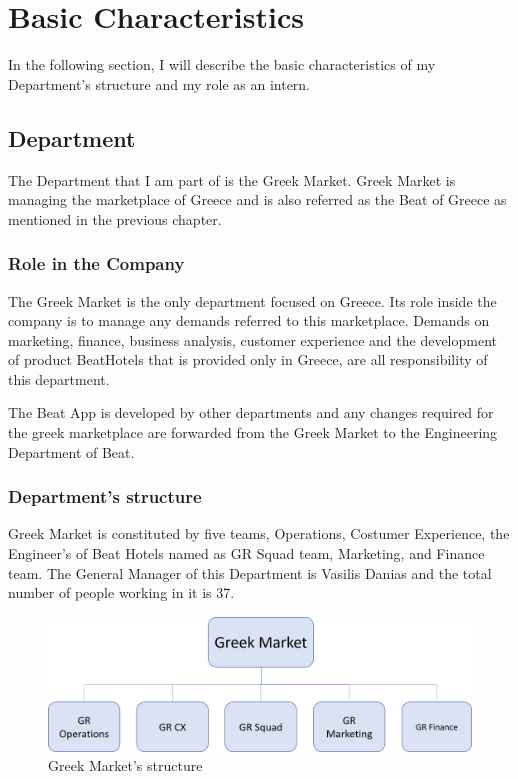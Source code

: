 
\chapter{Basic Characteristics} %
In the following section, I will describe the basic characteristics of my Department’s structure and my role as an intern.
\label{Chapter2} 

\section{ Department }
The Department that I am part of is the Greek Market. Greek Market is managing the marketplace of Greece and is also referred as the Beat of Greece as mentioned in the previous chapter.

\subsection{Role in the Company}
The Greek Market is the only department focused on Greece. Its role inside the company is to manage any demands referred to this marketplace. Demands on marketing, finance, business analysis, customer experience and the development of product BeatHotels that is provided only in Greece, are all responsibility of this department.\par 
The Beat App is developed by other departments and any changes required for the greek marketplace are forwarded from the Greek Market to the Engineering Department of Beat.

\subsection{Department's structure}
Greek Market is constituted by five teams, Operations, Costumer Experience, the Engineer's of Beat Hotels named as GR Squad team, Marketing, and Finance team. The General Manager of this Department is Vasilis Danias and the total number of people working in it is 37. 
\begin{figure}[h!]
	\begin{center}
		\includegraphics[scale=0.4]{images/GR_Market_structure.png}
	\end{center}
	\caption{Greek Market's structure}
\end{figure}


